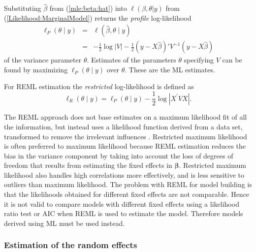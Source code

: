 \documentclass[12pt, a4paper]{report}
\theoremstyle{plain}
\theoremstyle{definition}
\theoremstyle{remark}
\begin{document}
Substituting $\hat{\beta}$ from (\ref{mle:beta:hat}) into $\ell(\beta, \theta|y)$ from (\ref{Likelihood:MarginalModel}) returns the \emph{profile} log-likelihood
\begin{eqnarray*}
	\ell_P(\theta \mid y) &=& \ell(\hat{\beta}, \theta \mid y) \\
	&=& -\frac{1}{2} \log |V| -\frac{1}{2}(y - X \hat{\beta})'V^{-1}(y - X \hat{\beta})
\end{eqnarray*}
of the variance parameter $\theta.$ Estimates of the parameters $\theta$ specifying $V$ can be found by maximizing $\ell_P(\theta \mid y)$ over $\theta.$ These are the ML estimates.

For REML estimation the \emph{restricted} log-likelihood is defined as
\[
\ell_R(\theta \mid y) =
\ell_P(\theta \mid y) -\frac{1}{2} \log |X^\prime VX |.
\]

The REML approach does not base estimates on a maximum likelihood fit of all the information, but instead uses a likelihood function derived from a data set, transformed to remove the irrelevant influences \citep{REMLDefine}.
Restricted maximum likelihood is often preferred to maximum likelihood because REML estimation reduces the bias in the variance component by taking into account the loss of degrees of freedom that results
from estimating the fixed effects in $\boldsymbol{\beta}$. Restricted maximum likelihood also handles high correlations more effectively, and is less sensitive to outliers than maximum likelihood.  The problem with REML for model building is that the likelihoods obtained for different fixed effects are not comparable. Hence it is not valid to compare models with different fixed effects using a likelihood ratio test or AIC when REML is used to
estimate the model. Therefore models derived using ML must be used instead.

\subsubsection{Estimation of the random effects}
\end{document}
